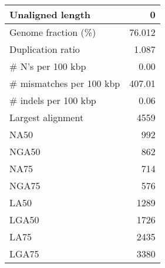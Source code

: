 \documentclass[12pt,a4paper]{article}
\begin{document}
\begin{table}[ht]
\begin{center}
\begin{tabular}{|l*{1}{|r}|}
Unaligned length & 0 \\ \hline
Genome fraction (\%) & 76.012 \\ \hline
Duplication ratio & 1.087 \\ \hline
\# N's per 100 kbp & 0.00 \\ \hline
\# mismatches per 100 kbp & 407.01 \\ \hline
\# indels per 100 kbp & 0.06 \\ \hline
Largest alignment & 4559 \\ \hline
NA50 & 992 \\ \hline
NGA50 & 862 \\ \hline
NA75 & 714 \\ \hline
NGA75 & 576 \\ \hline
LA50 & 1289 \\ \hline
LGA50 & 1726 \\ \hline
LA75 & 2435 \\ \hline
LGA75 & 3380 \\ \hline
\end{tabular}
\end{center}
\end{table}
\end{document}
